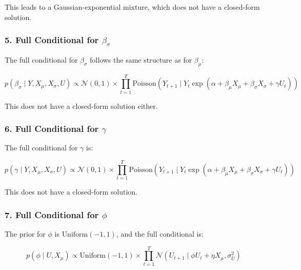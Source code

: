 \documentclass[
  letterpaper,
  DIV=11,
  numbers=noendperiod]{scrartcl}
\begin{document}
This leads to a Gaussian-exponential mixture, which does not have a
closed-form solution.

\subsubsection{\texorpdfstring{5. Full Conditional for
\(\beta_{\sigma}\)}{5. Full Conditional for \textbackslash beta\_\{\textbackslash sigma\}}}\label{full-conditional-for-beta_sigma}

The full conditional for \(\beta_{\sigma}\) follows the same structure
as for \(\beta_{\mu}\):

\begin{equation}
p(\beta_{\sigma} \mid Y, X_{\mu}, X_{\sigma}, U) \propto \mathcal{N}(0, 1) \times \prod_{t=1}^{T} \text{Poisson}(Y_{t+1} \mid Y_t \exp(\alpha + \beta_{\mu} X_{\mu} + \beta_{\sigma} X_{\sigma} + \gamma U_t))
\end{equation}

This does not have a closed-form solution either.

\subsubsection{\texorpdfstring{6. Full Conditional for
\(\gamma\)}{6. Full Conditional for \textbackslash gamma}}\label{full-conditional-for-gamma}

The full conditional for \(\gamma\) is:

\begin{equation}
p(\gamma \mid Y, X_{\mu}, X_{\sigma}, U) \propto \mathcal{N}(0, 1) \times \prod_{t=1}^{T} \text{Poisson}(Y_{t+1} \mid Y_t \exp(\alpha + \beta_{\mu} X_{\mu} + \beta_{\sigma} X_{\sigma} + \gamma U_t))
\end{equation}

This does not have a closed-form solution.

\subsubsection{\texorpdfstring{7. Full Conditional for
\(\phi\)}{7. Full Conditional for \textbackslash phi}}\label{full-conditional-for-phi}

The prior for \(\phi\) is \(\text{Uniform}(-1, 1)\), and the full
conditional is:

\begin{equation}
p(\phi \mid U, X_{\mu}) \propto \text{Uniform}(-1, 1) \times \prod_{t=1}^{T} \mathcal{N}(U_{t+1} \mid \phi U_t + \eta X_{\mu}, \sigma_U^2)
\end{equation}
\end{document}
